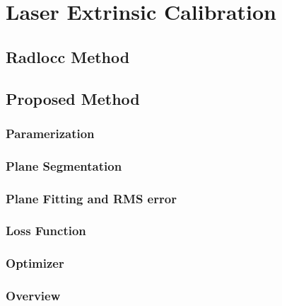 \section{Laser Extrinsic Calibration}
\label{section:laser-extrinsic-calibration}

\subsection{Radlocc Method}

\subsection{Proposed Method}

\subsubsection{Paramerization}

\subsubsection{Plane Segmentation}

\subsubsection{Plane Fitting and RMS error}

\subsubsection{Loss Function}
\subsubsection{Optimizer}

\subsubsection{Overview}

